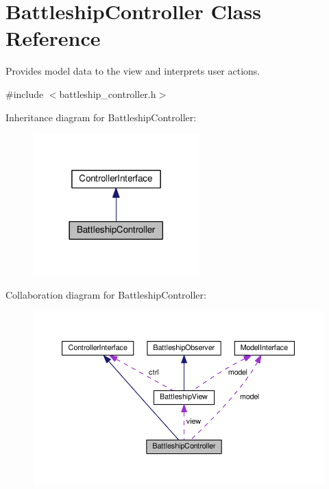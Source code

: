 \hypertarget{classBattleshipController}{}\section{Battleship\+Controller Class Reference}
\label{classBattleshipController}


Provides model data to the view and interprets user actions.  




{\ttfamily \#include $<$battleship\+\_\+controller.\+h$>$}



Inheritance diagram for Battleship\+Controller\+:\nopagebreak
\begin{figure}[H]
\begin{center}
\leavevmode
\includegraphics[width=182pt]{classBattleshipController__inherit__graph}
\end{center}
\end{figure}


Collaboration diagram for Battleship\+Controller\+:\nopagebreak
\begin{figure}[H]
\begin{center}
\leavevmode
\includegraphics[width=350pt]{classBattleshipController__coll__graph}
\end{center}
\end{figure}
